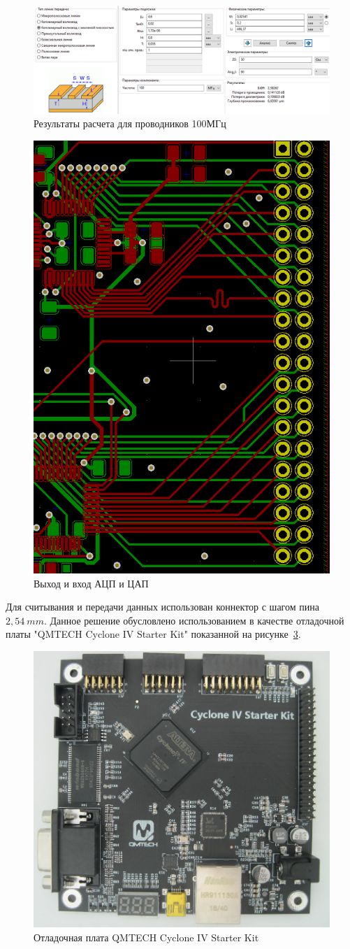 \documentclass[utf8x, 14pt, oneside, a4paper]{article}
\begin{document}
	
		
		\begin{figure}[h!]
			\centering
			\includegraphics[width=0.9\linewidth]{"Волновод 100Мгц"}
			\caption{Результаты расчета для проводников 100МГц}
			\label{fig:Волновод100}
		\end{figure}
	
		\begin{figure}[h!]
			\centering
			\includegraphics[width=0.5\linewidth]{Цифвх-вых}
			\caption{Выход и вход АЦП и ЦАП}
			\label{fig:цифра}
		\end{figure}
			
			Для считывания и передачи данных использован коннектор с шагом пина $2,54~mm$. Данное решение обусловлено использованием в качестве отладочной платы "QMTECH Cyclone IV Starter Kit" показанной на рисунке~\ref{fig:ПЛИС}.
		\begin{figure}[h!]
			\centering
			\includegraphics[width=0.5\linewidth]{ПЛИС}
			\caption{Отладочная плата QMTECH Cyclone IV Starter Kit}
			\label{fig:ПЛИС}
		\end{figure}
\end{document}
